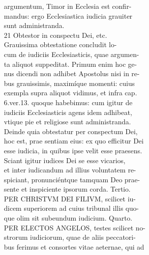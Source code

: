 \documentclass{article}
\begin{document}
\begin{pages}
                argumentum, Timor in Ecclesia est confir- \\
                mandus: ergo Ecclesiastica iudicia grauiter \\
                sunt administranda. \\
                21 Obtestor in conspectu Dei, etc. \\
                Grauissima obtestatione concludit lo- \\
                cum de iudiciis Ecclesiasticis, quae argumen- \\
                ta aliquot suppeditat. Primum enim hoc ge- \\
                nus dicendi non adhibet Apostolus nisi in re- \\
                bus grauissimis, maximíque momenti: cuius \\
                exempla supra aliquot vidimus, et infra cap. \\
                6.ver.13. quoque habebimus: cum igitur de \\
                iudiciis Ecclesiasticis agens idem adhibeat, \\
                vtique pie et religiose sunt administranda. \\
                Deinde quia obtestatur per conspectum Dei, \\
                hoc est, prae sentiam eius: ex quo efficitur Dei \\
                esse iudicia, in quibus ipse velit esse praesens. \\
                Sciant igitur iudices Dei se esse vicarios, \\
                et inter iudicandum ad illius voluntatem re- \\
                spiciant, pronunciéntque tamquam Deo prae- \\
                sente et inspiciente ipsorum corda. Tertio. \\
                PER CHRISTVM DEI FILIVM, scilicet iu- \\
                dicem superiorem ad cuius tribunal illis quo- \\
                que olim sit subeundum iudicium. Quarto. \\
                PER ELECTOS ANGELOS, testes scilicet no- \\
                strorum iudiciorum, quae de aliis peccatori- \\
                bus ferimus et consortes vitae aeternae, qui ad \\

\end{pages}
\end{document}
